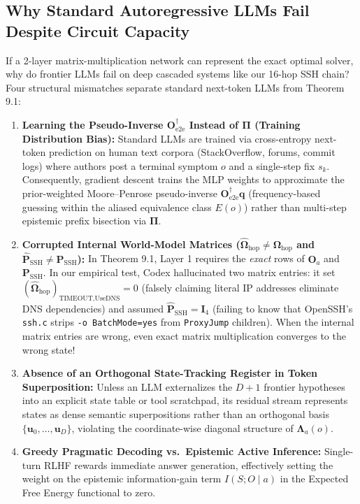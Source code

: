 \documentclass[11pt,a4paper]{article}
\theoremstyle{definition}
\theoremstyle{remark}
\begin{document}
\subsection{Why Standard Autoregressive LLMs Fail Despite Circuit Capacity}

If a 2-layer matrix-multiplication network can represent the exact optimal solver, why do frontier LLMs fail on deep cascaded systems like our 16-hop SSH chain? Four structural mismatches separate standard next-token LLMs from Theorem 9.1:

\begin{enumerate}
    \item \textbf{Learning the Pseudo-Inverse $\mathbf{O}_{\text{e2e}}^\dagger$ Instead of $\mathbf{\Pi}$ (Training Distribution Bias):}
    Standard LLMs are trained via cross-entropy next-token prediction on human text corpora (StackOverflow, forums, commit logs) where authors post a terminal symptom $o$ and a single-step fix $s_k$. Consequently, gradient descent trains the MLP weights to approximate the prior-weighted Moore--Penrose pseudo-inverse $\mathbf{O}_{\text{e2e}}^\dagger \bm{q}$ (frequency-based guessing within the aliased equivalence class $E(o)$) rather than multi-step epistemic prefix bisection via $\mathbf{\Pi}$.
    \item \textbf{Corrupted Internal World-Model Matrices ($\widehat{\bm{\Omega}}_{\text{hop}} \neq \bm{\Omega}_{\text{hop}}$ and $\widehat{\mathbf{P}}_{\text{SSH}} \neq \mathbf{P}_{\text{SSH}}$):}
    In Theorem 9.1, Layer 1 requires the \emph{exact} rows of $\mathbf{O}_a$ and $\mathbf{P}_{\text{SSH}}$. In our empirical test, Codex hallucinated two matrix entries: it set $(\widehat{\bm{\Omega}}_{\text{hop}})_{\text{TIMEOUT}, \text{UseDNS}} = 0$ (falsely claiming literal IP addresses eliminate DNS dependencies) and assumed $\widehat{\mathbf{P}}_{\text{SSH}} = \mathbf{I}_4$ (failing to know that OpenSSH's \texttt{ssh.c} strips \texttt{-o BatchMode=yes} from \texttt{ProxyJump} children). When the internal matrix entries are wrong, even exact matrix multiplication converges to the wrong state!
    \item \textbf{Absence of an Orthogonal State-Tracking Register in Token Superposition:}
    Unless an LLM externalizes the $D+1$ frontier hypotheses into an explicit state table or tool scratchpad, its residual stream represents states as dense semantic superpositions rather than an orthogonal basis $\{\bm{u}_0, \dots, \bm{u}_D\}$, violating the coordinate-wise diagonal structure of $\mathbf{\Lambda}_a(o)$.
    \item \textbf{Greedy Pragmatic Decoding vs.\ Epistemic Active Inference:}
    Single-turn RLHF rewards immediate answer generation, effectively setting the weight on the epistemic information-gain term $I(S; O \mid a)$ in the Expected Free Energy functional to zero.
\end{enumerate}
\end{document}
